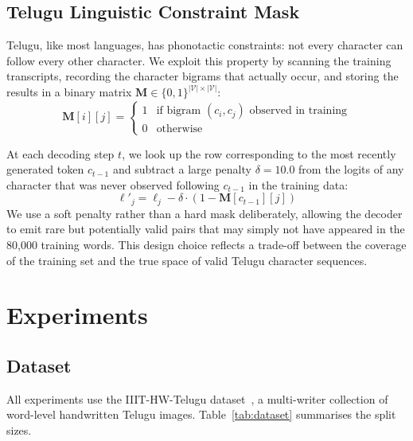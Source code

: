 \documentclass[pdflatex,sn-mathphys-num]{sn-jnl}
\begin{document}
\subsection{Telugu Linguistic Constraint Mask}\label{sec:method:mask}

Telugu, like most languages, has phonotactic constraints: not every character can follow every other character. We exploit this property by scanning the training transcripts, recording the character bigrams that actually occur, and storing the results in a binary matrix $\mathbf{M} \in \{0, 1\}^{|\mathcal{V}| \times |\mathcal{V}|}$:
\begin{equation}
    \mathbf{M}[i][j] = \begin{cases} 1 & \text{if bigram } (c_i, c_j) \text{ observed in training} \\ 0 & \text{otherwise} \end{cases}
\end{equation}

At each decoding step $t$, we look up the row corresponding to the most recently generated token $c_{t-1}$ and subtract a large penalty $\delta = 10.0$ from the logits of any character that was never observed following $c_{t-1}$ in the training data:
\begin{equation}
    \ell'_j = \ell_j - \delta \cdot (1 - \mathbf{M}[c_{t-1}][j])
\end{equation}
We use a soft penalty rather than a hard mask deliberately, allowing the decoder to emit rare but potentially valid pairs that may simply not have appeared in the 80,000 training words. This design choice reflects a trade-off between the coverage of the training set and the true space of valid Telugu character sequences.

\section{Experiments}\label{sec:experiments}

\subsection{Dataset}\label{sec:exp:data}

All experiments use the IIIT-HW-Telugu dataset~\cite{dutta2018, gongidi2021iiit}, a multi-writer collection of word-level handwritten Telugu images. Table~\ref{tab:dataset} summarises the split sizes.
\end{document}
